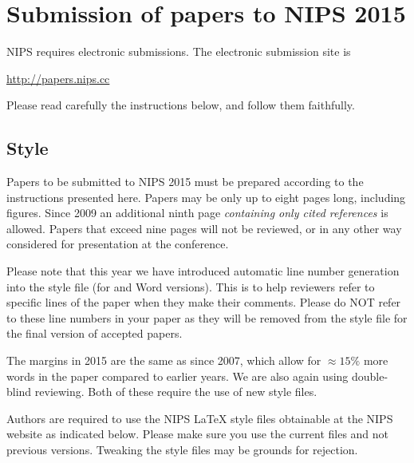 \documentclass{article} %
\begin{document}
\section{Submission of papers to NIPS 2015}

NIPS requires electronic submissions.  The electronic submission site is  
\begin{center}
   \url{http://papers.nips.cc}
\end{center}

Please read carefully the
instructions below, and follow them faithfully.
\subsection{Style}

Papers to be submitted to NIPS 2015 must be prepared according to the
instructions presented here. Papers may be only up to eight pages long,
including figures. Since 2009 an additional ninth page \textit{containing only
cited references} is allowed. Papers that exceed nine pages will not be
reviewed, or in any other way considered for presentation at the conference.

Please note that this year we have introduced automatic line number generation
into the style file (for \LaTeXe and Word versions). This is to help reviewers
refer to specific lines of the paper when they make their comments. Please do
NOT refer to these line numbers in your paper as they will be removed from the
style file for the final version of accepted papers.

The margins in 2015 are the same as since 2007, which allow for $\approx 15\%$
more words in the paper compared to earlier years. We are also again using 
double-blind reviewing. Both of these require the use of new style files.

Authors are required to use the NIPS \LaTeX{} style files obtainable at the
NIPS website as indicated below. Please make sure you use the current files and
not previous versions. Tweaking the style files may be grounds for rejection.


\end{document}
